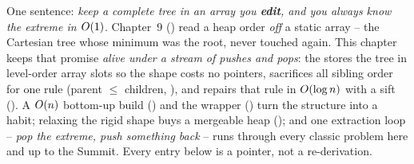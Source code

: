 

One sentence: \emph{keep a complete tree in an array you \textbf{edit}, and you always know the extreme in
$O(1)$}. Chapter~9 () read a heap order \emph{off} a static array -- the Cartesian tree whose
minimum was the root, never touched again. This chapter keeps that promise \emph{alive under a stream of
pushes and pops}: the  stores the tree in level-order array slots so the shape costs no
pointers, sacrifices all sibling order for one rule (parent $\le$ children, ), and repairs
that rule in $O(\log n)$ with a sift (). A $O(n)$ bottom-up build ()
and the  wrapper () turn the structure into a habit; relaxing the rigid
shape buys a mergeable heap (); and one extraction loop -- \emph{pop the extreme, push
something back} -- runs through every classic problem here and up to the Summit. Every entry below is a
pointer, not a re-derivation.

